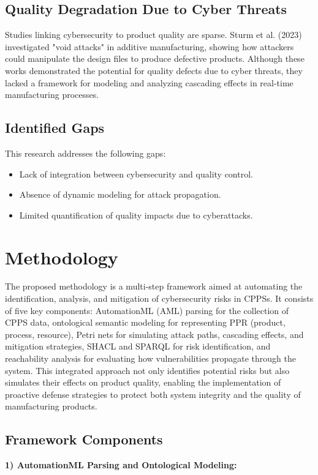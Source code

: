 \documentclass[conference]{IEEEtran}
\begin{document}
\subsection{Quality Degradation Due to Cyber Threats}
Studies linking cybersecurity to product quality are sparse. Sturm et al. (2023) investigated "void attacks" in additive manufacturing, showing how attackers could manipulate the design files to produce defective products. Although these works demonstrated the potential for quality defects due to cyber threats, they lacked a framework for modeling and analyzing cascading effects in real-time manufacturing processes.

\subsection{Identified Gaps}
This research addresses the following gaps:
\begin{itemize}
    \item Lack of integration between cybersecurity and quality control.
    \item Absence of dynamic modeling for attack propagation.
    \item Limited quantification of quality impacts due to cyberattacks.
\end{itemize}

\section{Methodology}
The proposed methodology is a multi-step framework aimed at automating the identification, analysis, and mitigation of cybersecurity risks in CPPSs. It consists of five key components: AutomationML (AML) parsing for the collection of CPPS data, ontological semantic modeling for representing PPR (product, process, resource), Petri nets for simulating attack paths, cascading effects, and mitigation strategies, SHACL and SPARQL for risk identification, and reachability analysis for evaluating how vulnerabilities propagate through the system. This integrated approach not only identifies potential risks but also simulates their effects on product quality, enabling the implementation of proactive defense strategies to protect both system integrity and the quality of manufacturing products.

\subsection{Framework Components}
\textbf{1) AutomationML Parsing and Ontological Modeling:} 
\end{document}
